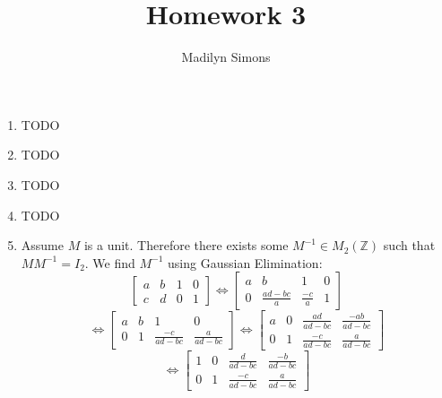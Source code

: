 \documentclass{article}
\title{Homework 3}
\author{Madilyn Simons}
\date{}
\begin{document}
\maketitle

\begin{enumerate}

\item TODO

\item TODO

\item TODO

\item TODO

\item Assume $M$ is a unit.  Therefore there exists some $M^{-1} \in M_2(\mathbb{Z})$
such that $MM^{-1} = I_2$.  We find $M^{-1}$ using Gaussian Elimination:
\[
\left[
\begin{array}{cc|cc}
a & b & 1 & 0 \\
c & d & 0 & 1
\end{array}
\right]
\Leftrightarrow
\left[
\begin{array}{cc|cc}
a & b & 1 & 0 \\
0 & \frac{ad-bc}{a} & \frac{-c}{a} & 1
\end{array}
\right]
\]
\[
\Leftrightarrow
\left[
\begin{array}{cc|cc}
a & b & 1 & 0 \\
0 & 1 & \frac{-c}{ad-bc} & \frac{a}{ad-bc}
\end{array}
\right]
\Leftrightarrow
\left[
\begin{array}{cc|cc}
a & 0 & \frac{ad}{ad-bc} & \frac{-ab}{ad-bc} \\
0 & 1 & \frac{-c}{ad-bc} & \frac{a}{ad-bc}
\end{array}
\right]
\]
\[
\Leftrightarrow
\left[
\begin{array}{cc|cc}
1 & 0 & \frac{d}{ad-bc} & \frac{-b}{ad-bc} \\
0 & 1 & \frac{-c}{ad-bc} & \frac{a}{ad-bc}
\end{array}
\right]
\]


\end{enumerate}
\end{document}
